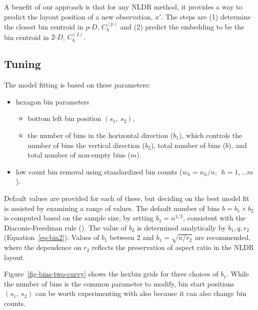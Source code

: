 \documentclass[
  11pt,
  a4paper,
]{report}
\providecommand{\tightlist}{%
  \setlength{\itemsep}{0pt}\setlength{\parskip}{0pt}}
\def\tightlist{}
\newcommand\pD{$p\text{-}D$}
\newcommand\gD{$2\text{-}D$}
\begin{document}
A benefit of our approach is that for any NLDR method, it provides a way
to predict the layout position of a new observation, \(x'\). The steps
are (1) determine the closest bin centroid in \pD{}, \(C^{(p)}_{h}\) and
(2) predict the embedding to be the bin centroid in \gD{},
\(C^{(2)}_{h}\).

\subsection{Tuning}\label{tuning}

The model fitting is based on these parameters:

\begin{itemize}
\tightlist
\item
  hexagon bin parameters

  \begin{itemize}
  \tightlist
  \item
    bottom left bin position \((s_1, \ s_2)\),
  \item
    the number of bins in the horizontal direction (\(b_1\)), which
    controls the number of bins the vertical direction (\(b_2\)), total
    number of bins (\(b\)), and total number of non-empty bins (\(m\)).
  \end{itemize}
\item
  low count bin removal using standardized bin counts
  (\(w_h = n_h/n, ~~h=1, \dots m\)).
\end{itemize}

Default values are provided for each of these, but deciding on the best
model fit is assisted by examining a range of values. The default number
of bins \(b=b_1\times b_2\) is computed based on the sample size, by
setting \(b_1=n^{1/3}\), consistent with the Diaconis-Freedman rule
(). The value of
\(b_2\) is determined analytically by \(b_1, q, r_2\)
(Equation~\ref{eq-bin2}). Values of \(b_1\) between \(2\) and
\(b_1 = \sqrt{n/r_2}\) are recommended, where the dependence on \(r_2\)
reflects the preservation of aspect ratio in the NLDR layout.

Figure~\ref{fig-bins-two-curvy} shows the hexbin grids for three choices
of \(b_1\). While the number of bins is the common parameter to modify,
bin start positions \((s_1, \ s_2)\) can be worth experimenting with
also because it can also change bin counts.
\end{document}
